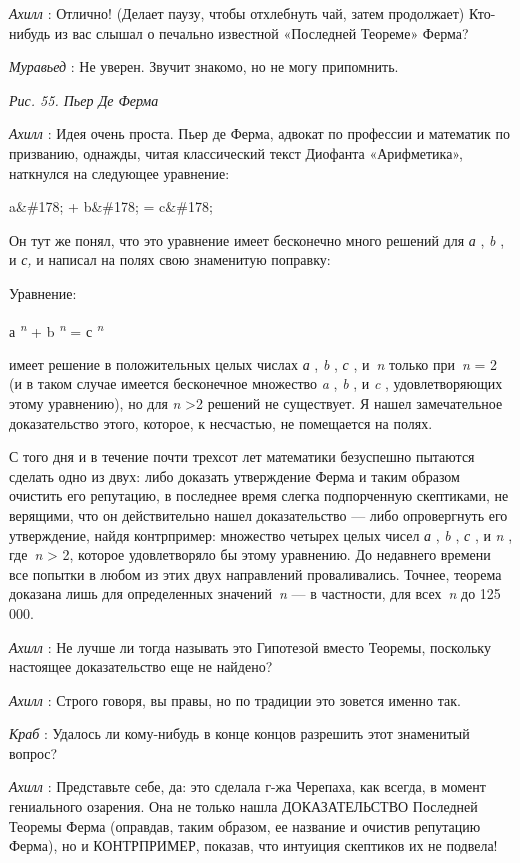 \emph{Ахилл} : Отлично! (Делает паузу, чтобы отхлебнуть чай, затем продолжает) Кто-нибудь из вас слышал о печально известной «Последней Теореме» Ферма?

\emph{Муравьед} : Не уверен. Звучит знакомо, но не могу припомнить.

\emph{Рис. 55. Пьер Де Ферма}

\emph{Ахилл} : Идея очень проста. Пьер де Ферма, адвокат по профессии и математик по призванию, однажды, читая классический текст Диофанта «Арифметика», наткнулся на следующее уравнение:

a\&\#178; + b\&\#178; = c\&\#178;

Он тут же понял, что это уравнение имеет бесконечно много решений для \emph{а} , \emph{b} , и \emph{с,} и написал на полях свою знаменитую поправку:

Уравнение:

а \textsuperscript{\emph{n}} + b \textsuperscript{\emph{n}} = с \textsuperscript{\emph{n}}

имеет решение в положительных целых числах \emph{а} , \emph{b} , \emph{с} , и~\emph{n} только при~\emph{n} = 2 (и в таком случае имеется бесконечное множество \emph{a} , \emph{b} , и \emph{c} , удовлетворяющих этому уравнению), но для \emph{n} \textgreater2 решений не существует. Я нашел замечательное доказательство этого, которое, к несчастью, не помещается на полях.

С того дня и в течение почти трехсот лет математики безуспешно пытаются сделать одно из двух: либо доказать утверждение Ферма и таким образом очистить его репутацию, в последнее время слегка подпорченную скептиками, не верящими, что он действительно нашел доказательство --- либо опровергнуть его утверждение, найдя контрпример: множество четырех целых чисел \emph{а} , \emph{b} , \emph{с} , и \emph{n} , где~\emph{n} \textgreater{} 2, которое удовлетворяло бы этому уравнению. До недавнего времени все попытки в любом из этих двух направлений проваливались. Точнее, теорема доказана лишь для определенных значений~\emph{n} --- в частности, для всех~\emph{n} до 125 000.

\emph{Ахилл} : Не лучше ли тогда называть это Гипотезой вместо Теоремы, поскольку настоящее доказательство еще не найдено?

\emph{Ахилл} : Строго говоря, вы правы, но по традиции это зовется именно так.

\emph{Краб} : Удалось ли кому-нибудь в конце концов разрешить этот знаменитый вопрос?

\emph{Ахилл} : Представьте себе, да: это сделала г-жа Черепаха, как всегда, в момент гениального озарения. Она не только нашла ДОКАЗАТЕЛЬСТВО Последней Теоремы Ферма (оправдав, таким образом, ее название и очистив репутацию Ферма), но и КОНТРПРИМЕР, показав, что интуиция скептиков их не подвела!

